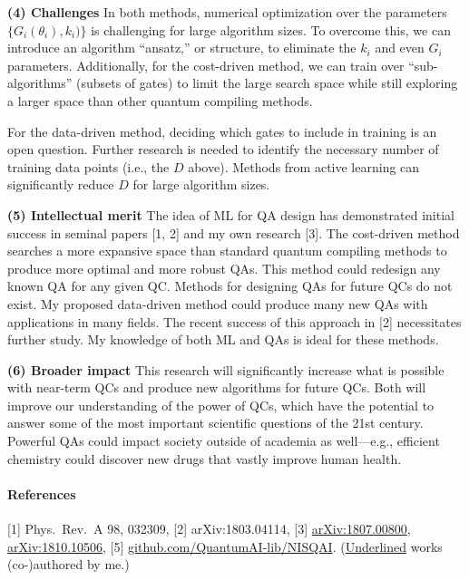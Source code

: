 \documentclass[12pt]{article}
\renewcommand{\>}{\rangle}
\newcommand{\tab}{\hspace*{0.8em}}
\begin{document}
\noindent  
\textbf{(4) Challenges} \tab In both methods, numerical optimization over the parameters $\{G_i(\theta_i), k_i)\}$ is challenging for large algorithm sizes. To overcome this, we can introduce an algorithm ``ansatz,'' or structure, to eliminate the $k_i$ and even $G_i$ parameters. Additionally, for the cost-driven method, we can train over ``sub-algorithms'' (subsets of gates) to limit the large search space while still exploring a larger space than other quantum compiling methods. %

\noindent
\tab For the data-driven method, deciding which gates to include in training is an open question. Further research is needed to identify the necessary number of training data points (i.e., the $D$ above). Methods from active learning can significantly reduce $D$ for large algorithm sizes.

\noindent  
\textbf{(5) Intellectual merit} The idea of ML for QA design has demonstrated initial success in seminal papers [1, 2] and my own research [3]. The cost-driven method searches a more expansive space than standard quantum compiling methods to produce more optimal and more robust QAs. This method could redesign any known QA for any given QC.
Methods for designing QAs for future QCs do not exist. My proposed data-driven method could produce many new QAs with applications in many fields. The recent success of this approach in [2] necessitates further study. My knowledge of both ML and QAs is ideal for these methods.

{
\noindent 
\textbf{(6) Broader impact} \tab This research will significantly increase what is possible with near-term QCs and produce new algorithms for future QCs. Both will improve our understanding of the power of QCs, which have the potential to answer some of the most important scientific questions of the 21st century. Powerful QAs could impact society outside of academia as well---e.g., efficient chemistry could discover new drugs that vastly improve human health.
}

\vspace{-1.1em}

{
\footnotesize
\paragraph{\textbf{References}} \hspace*{1em} [1] Phys.~Rev.~A 98, 032309, [2] arXiv:1803.04114, [3] \underline{arXiv:1807.00800}, \newline [4] \underline{arXiv:1810.10506}, [5] \underline{github.com/QuantumAI-lib/NISQAI}. (\underline{Underlined} works (co-)authored by me.)
}

\nopagebreak[9]
\end{document}
